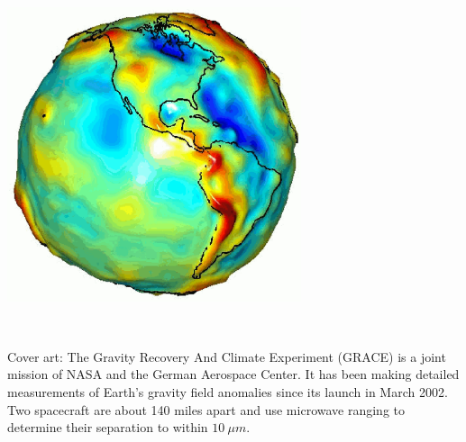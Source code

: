\documentclass[twoside]{article}
\newcounter{activity}
\begin{document}
\begin{center}

\includegraphics[width=3.4in]{grace1-1.ps}

\end{center}

\thispagestyle{empty}

\newpage


\ 
\setcounter{page}{1}

\vfill


Cover art: The Gravity Recovery And Climate Experiment (GRACE) is a joint mission of NASA and the German Aerospace Center. 
It has been making detailed measurements of Earth's gravity field anomalies since its launch in March 2002.
Two spacecraft are about 140 miles apart and use microwave ranging to determine their separation to within $10~\mu m$.

\pagebreak

\tableofcontents{}

\newpage

\setcounter{page}{3}

\thispagestyle{plain}

\vfill

\ 

\pagebreak

%
\end{document}
